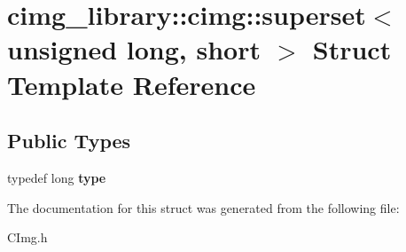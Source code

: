 \hypertarget{structcimg__library_1_1cimg_1_1superset_3_01unsigned_01long_00_01short_01_4}{\section{cimg\-\_\-library\-:\-:cimg\-:\-:superset$<$ unsigned long, short $>$ Struct Template Reference}
\label{structcimg__library_1_1cimg_1_1superset_3_01unsigned_01long_00_01short_01_4}
}
\subsection*{Public Types}
\begin{DoxyCompactItemize}
\item 
\hypertarget{structcimg__library_1_1cimg_1_1superset_3_01unsigned_01long_00_01short_01_4_afa6580e3b78e7375a4aebb553f27cb08}{typedef long {\bfseries type}}\label{structcimg__library_1_1cimg_1_1superset_3_01unsigned_01long_00_01short_01_4_afa6580e3b78e7375a4aebb553f27cb08}

\end{DoxyCompactItemize}


The documentation for this struct was generated from the following file\-:\begin{DoxyCompactItemize}
\item 
C\-Img.\-h\end{DoxyCompactItemize}
